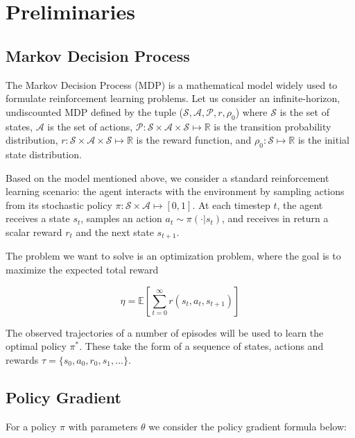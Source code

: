 \section{Preliminaries}
\label{sec:preleminaries}


\subsection{Markov Decision Process}
The Markov Decision Process (MDP) is a mathematical model widely used to formulate reinforcement learning problems. Let us consider an infinite-horizon, undiscounted MDP defined by the tuple ($\mathcal{S}, \mathcal{A}, \mathcal{P}, r, \rho_0$) where $\mathcal{S}$ is the set of states, $\mathcal{A}$ is the set of actions, $\mathcal{P}: \mathcal{S}\times\mathcal{A}\times\mathcal{S}\mapsto \mathbb{R}$ is the transition probability distribution, $r: \mathcal{S}\times\mathcal{A}\times\mathcal{S} \mapsto \mathbb{R}$ is the reward function, and $\rho_0:\mathcal{S}\mapsto\mathbb{R}$ is the initial state distribution.

Based on the model mentioned above, we consider a standard reinforcement learning scenario: the agent interacts with the environment by sampling actions from its stochastic policy $\pi:\mathcal{S}\times\mathcal{A}\mapsto[0,1]$. At each timestep $t$, the agent receives a state $s_t$, samples an action $a_t \sim \pi(\cdot | s_t)$, and receives in return a scalar reward $r_t$ and the next state $s_{t+1}$.

The problem we want to solve is an optimization problem, where the goal is to maximize the expected total reward

\[
\eta = \mathbb{E}
\left[ \sum_{t=0}^{\infty}r(s_t, a_t, s_{t+1})\right]
\] 

The observed trajectories of a number of episodes will be used to learn the optimal policy $\pi^*$. These take the form of a sequence of states, actions and rewards $\tau = \{s_0, a_0, r_0, s_1, ... \}$. 


\subsection{Policy Gradient}
For a policy $\pi$ with parameters $\theta$ we consider the policy gradient formula below:

